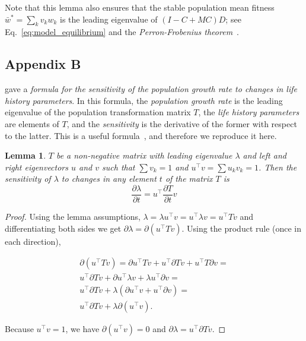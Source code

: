 \documentclass[9pt, a4paper, twocolumn]{extarticle}
\newcommand*{\tr}{^\intercal}
\newtheorem{lemma}{Lemma}
\begin{document}
Note that this lemma also ensures that the stable population mean fitness $\bar{w}^*=\sum_k{v_k w_k}$ is the leading eigenvalue of $(I - C + M C) D$; see Eq.~\ref{eq:model_equilibrium} and the \emph{Perron-Frobenius theorem}~\cite[Appendix~A]{Otto2007}.

\subsection*{Appendix B}\label{sec:AppB}

\citet{Caswell1978} gave a \emph{formula for the sensitivity of the population growth rate to changes in life history parameters}.
In this formula, the \emph{population growth rate} is the leading eigenvalue of the population transformation matrix $T$, the \emph{life history parameters} are elements of $T$, and the \emph{sensitivity} is the derivative of the former with respect to the latter.
This is a useful formula~\citep[ch.~10]{Caswell1978,Hermisson2002,Ram2012,Otto2007}, and therefore we reproduce it here.

\begin{lemma}
$T$ be a non-negative matrix with leading eigenvalue $\lambda$ and left and right eigenvectors $u$ and $v$ such that $\sum{v_k}=1$ and $u\tr v = \sum{u_k v_k} = 1$.
Then the sensitivity of $\lambda$ to changes in any element $t$ of the matrix $T$ is
\begin{equation}\label{eq:Caswells_formula}
\frac{\partial \lambda}{\partial t} = 
u\tr \frac{\partial T}{\partial t} v
\end{equation}
\end{lemma}

\begin{proof} 
Using the lemma assumptions,
$\lambda = \lambda u\tr v = u\tr \lambda v = u\tr T v$ and differentiating both sides we get $\partial \lambda = \partial (u\tr T v)$.
Using the product rule (once in each direction),

\begin{multline}
\partial (u\tr T v) = 
\partial u\tr T v + u\tr \partial T v + u\tr T \partial v = \\
u\tr \partial T v + \partial u\tr \lambda v  + \lambda u\tr \partial v = \\
u\tr \partial T v + \lambda(\partial u\tr v  + u\tr \partial v) = \\
u\tr \partial T v + \lambda \partial(u\tr v).
\end{multline}

Because $u\tr v = 1$,
we have $\partial (u\tr v) = 0$ and
$\partial \lambda = u\tr \partial T v$.
\end{proof}
\end{document}
